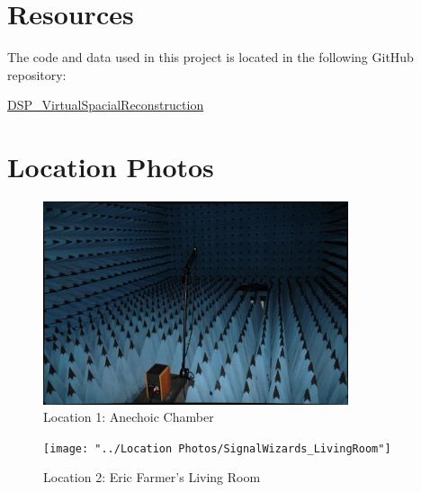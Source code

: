 \documentclass[letterpaper, 11pt, onecolumn, oneside]{article}
\begin{document}
\clearpage
\begin{appendix}
\section{Resources}
\label{appendix:resources}
The code and data used in this project is located in the following GitHub repository:

\href{https://github.com/WhoFama24/DSP_VirtualSpacialReconstruction}{DSP\_VirtualSpacialReconstruction}

\section{Location Photos}
\label{appendix:locationPhotos}
\begin{figure}[h!t]
    \includegraphics[width=0.8\textwidth]{"../Location Photos/SignalWizards_AnechoicChamber"}
    \centering
    \caption{Location 1: Anechoic Chamber}
\end{figure}

\begin{figure}[h!t]
    \texttt{[image: "../Location Photos/SignalWizards\_LivingRoom"]}
    \centering
    \caption{Location 2: Eric Farmer's Living Room}
\end{figure}


\end{appendix}
\end{document}
